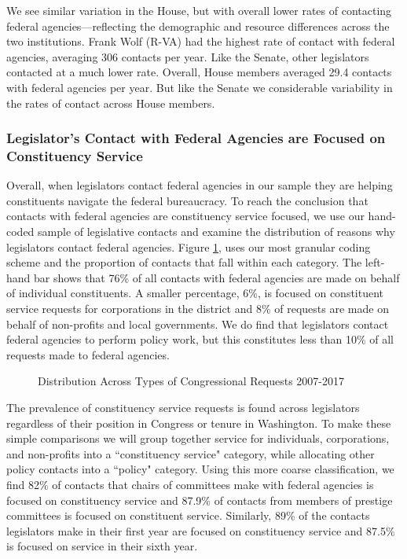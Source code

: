 \documentclass[12pt]{article}
\begin{document}
We see similar variation in the House, but with overall lower rates of contacting federal agencies---reflecting the demographic and resource differences across the two institutions.  Frank Wolf (R-VA) had the highest rate of contact with federal agencies, averaging 306 contacts per year. Like the Senate, other legislators contacted at a much lower rate.  Overall, House members averaged 29.4 contacts with federal agencies per year.  But like the Senate we considerable variability in the rates of contact across House members.   

\subsubsection{Legislator's Contact with Federal Agencies are Focused on Constituency Service}
Overall, when legislators contact federal agencies in our sample they are helping constituents navigate the federal bureaucracy.  To reach the conclusion that contacts with federal agencies are constituency service focused, we use our hand-coded sample of legislative contacts and examine the distribution of reasons why legislators contact federal agencies.  Figure \ref{f:type2}, uses our most granular coding scheme and the proportion of contacts that fall within each category.  The left-hand bar shows that 76\% of all contacts with federal agencies are made on behalf of individual constituents.  A smaller percentage, 6\%,  is focused on constituent service requests for corporations in the district and 8\% of requests are made on behalf of non-profits and local governments.  We do find that legislators contact federal agencies to perform policy work, but this constitutes less than 10\% of all requests made to federal agencies.  


\begin{figure}[hbt!]
\centering
\caption{Distribution Across Types of Congressional Requests 2007-2017} \label{f:type2}
\end{figure}

The prevalence of constituency service requests is found across legislators regardless of their position in Congress or tenure in Washington.  To make these simple comparisons we will group together service for individuals, corporations, and non-profits into a ``constituency service" category, while allocating other policy contacts into a ``policy" category.  Using this more coarse classification, we find 82\% of contacts that chairs of committees make with federal agencies is focused on constituency service and 87.9\% of contacts from members of prestige committees is focused on constituent service.  Similarly, 89\% of the contacts legislators make in their first year are focused on constituency service and 87.5\% is focused on service in their sixth year. 
\end{document}
